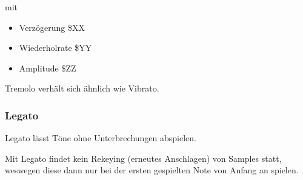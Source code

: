 \medskip



\medskip

mit

\begin{itemize}
	\item Verzögerung \$XX
	\item Wiederholrate \$YY
	\item Amplitude \$ZZ
\end{itemize}

Tremolo verhält sich ähnlich wie Vibrato.


\subsubsection{Legato}

Legato lässt Töne ohne Unterbrechungen abspielen.

\medskip



\medskip

Mit Legato findet kein Rekeying (erneutes Anschlagen) von Samples statt, weswegen diese dann nur bei der ersten gespielten Note von Anfang an spielen.

